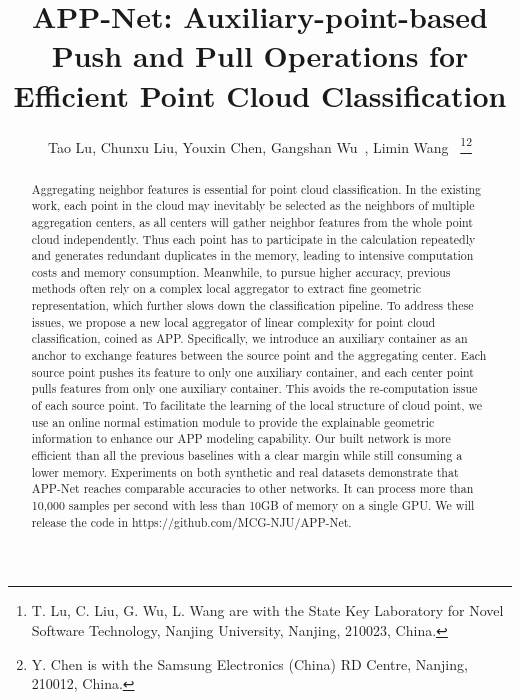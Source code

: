 \documentclass[journal]{IEEEtran}
\begin{document}
\title{APP-Net: Auxiliary-point-based Push and Pull Operations for Efficient Point Cloud Classification}

\author{Tao Lu, Chunxu Liu, Youxin Chen, Gangshan Wu~, Limin Wang~
\thanks{T. Lu, C. Liu, G. Wu, L. Wang are with the State Key Laboratory for Novel Software Technology, Nanjing  University, Nanjing, 210023, China.}\thanks{Y. Chen is with the Samsung Electronics (China) RD Centre, Nanjing, 210012, China.}
}




\maketitle

\begin{abstract}
Aggregating neighbor features is essential for point cloud classification. In the existing work, each point in the cloud may inevitably be selected as the neighbors of multiple aggregation centers, as all centers will gather neighbor features from the whole point cloud independently. Thus each point has to participate in the calculation repeatedly and generates redundant duplicates in the memory, leading to intensive computation costs and memory consumption. Meanwhile, to pursue higher accuracy, previous methods often rely on a complex local aggregator to extract fine geometric representation, which further slows down the classification pipeline. To address these issues, we propose a new local aggregator of linear complexity for point cloud classification, coined as APP. Specifically, we introduce an auxiliary container as an anchor to exchange features between the source point and the aggregating center. Each source point pushes its feature to only one auxiliary container, and each center point pulls features from only one auxiliary container. This avoids the re-computation issue of each source point. To facilitate the learning of the local structure of cloud point, we use an online normal estimation module to provide the explainable geometric information to enhance our APP modeling capability. Our built network is more efficient than all the previous baselines with a clear margin while still consuming a lower memory. Experiments on both synthetic and real datasets demonstrate that APP-Net reaches comparable accuracies to other networks. It can process more than 10,000 samples per second with less than 10GB of memory on a single GPU. We will release the code in https://github.com/MCG-NJU/APP-Net.



\end{abstract}
\end{document}
